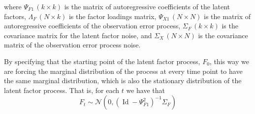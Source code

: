 where $\Psi_{F1} \, (k \times k)$ is the matrix of autoregressive coefficients of the latent factors, $\Lambda_F \, (N \times k)$ is the factor loadings matrix, $\Psi_{X1} \, (N \times N)$ is the matrix of autoregressive coefficients of the observation error process, $\Sigma_F \, (k \times k)$ is the covariance matrix for the latent factor noise, and  $\Sigma_X \, (N \times N)$ is the covariance matrix of the observation error process noise.

By specifying that the starting point of the latent factor process, $F_0$, this way we are forcing the marginal distribution of the process at every time point to have the same marginal distribution, which is also the stationary distribution of the latent factor process. That is, for each $t$ we have that 
\begin{equation}
	F_t \sim \mathcal N \left( 0, \left( \operatorname{Id} - \Psi_{F1}^2 \right)^{-1} \Sigma_F \right)
\end{equation}

